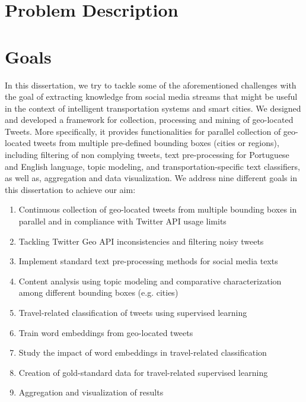 \documentclass[9pt,a4paper]{extarticle}
\begin{document}
\begin{multicols}{2}
\section{Problem Description}

\section{Goals}\label{sec:goals}


In this dissertation, we try to tackle some of the aforementioned challenges with the goal of extracting knowledge from social media streams that might be useful in the context of intelligent transportation systems and smart cities. We designed and developed a framework for collection, processing and mining of geo-located Tweets. More specifically, it provides functionalities for parallel collection of geo-located tweets from multiple pre-defined bounding boxes (cities or regions), including filtering of non complying tweets, text pre-processing for Portuguese and English language, topic modeling, and transportation-specific text classifiers, as well as, aggregation and data visualization. We address nine different goals in this dissertation to achieve our aim:

\begin{enumerate}
	\item Continuous collection of geo-located tweets from multiple bounding boxes in parallel and in compliance with Twitter API usage limits
	\item Tackling Twitter Geo API inconsistencies and filtering noisy tweets
	\item Implement standard text pre-processing methods for social media texts
	\item Content analysis using topic modeling and comparative characterization among different bounding boxes (e.g. cities)
	\item Travel-related classification of tweets using supervised learning
	\item Train word embeddings from geo-located tweets
	\item Study the impact of word embeddings in travel-related classification
	\item Creation of gold-standard data for travel-related supervised learning
	\item Aggregation and visualization of results
\end{enumerate}


\end{multicols}
\end{document}
